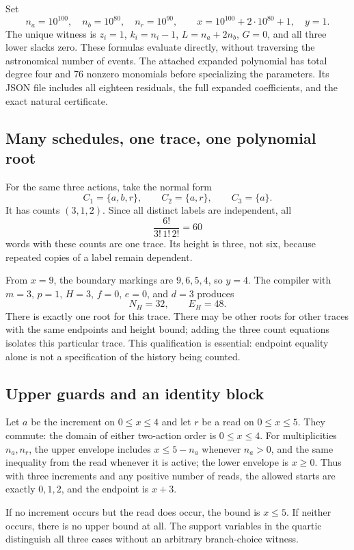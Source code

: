 \documentclass[11pt,a4paper]{article}
\theoremstyle{definition}
\theoremstyle{remark}
\begin{document}
Set
\[
 n_a=10^{100},\quad n_b=10^{80},\quad n_r=10^{90},\qquad
 x=10^{100}+2\cdot10^{80}+1,\quad y=1.
\]
The unique witness is $z_i=1$, $k_i=n_i-1$, $L=n_a+2n_b$, $G=0$, and all three lower slacks zero. These formulas evaluate directly, without traversing the astronomical number of events. The attached expanded polynomial has total degree four and 76 nonzero monomials before specializing the parameters. Its JSON file includes all eighteen residuals, the full expanded coefficients, and the exact natural certificate.

\subsection{Many schedules, one trace, one polynomial root}
For the same three actions, take the normal form
\[
 C_1=\{a,b,r\},\qquad C_2=\{a,r\},\qquad C_3=\{a\}.
\]
It has counts $(3,1,2)$. Since all distinct labels are independent, all
\[
 \frac{6!}{3!\,1!\,2!}=60
\]
words with these counts are one trace. Its height is three, not six, because repeated copies of a label remain dependent.

From $x=9$, the boundary markings are $9,6,5,4$, so $y=4$. The compiler with $m=3$, $p=1$, $H=3$, $f=0$, $e=0$, and $d=3$ produces
\[
 N_H=32,\qquad E_H=48.
\]
There is exactly one root for this trace. There may be other roots for other traces with the same endpoints and height bound; adding the three count equations isolates this particular trace. This qualification is essential: endpoint equality alone is not a specification of the history being counted.

\subsection{Upper guards and an identity block}
Let $a$ be the increment on $0\le x\le4$ and let $r$ be a read on $0\le x\le5$. They commute: the domain of either two-action order is $0\le x\le4$. For multiplicities $n_a,n_r$, the upper envelope includes $x\le5-n_a$ whenever $n_a>0$, and the same inequality from the read whenever it is active; the lower envelope is $x\ge0$. Thus with three increments and any positive number of reads, the allowed starts are exactly $0,1,2$, and the endpoint is $x+3$.

If no increment occurs but the read does occur, the bound is $x\le5$. If neither occurs, there is no upper bound at all. The support variables in the quartic distinguish all three cases without an arbitrary branch-choice witness.
\end{document}
